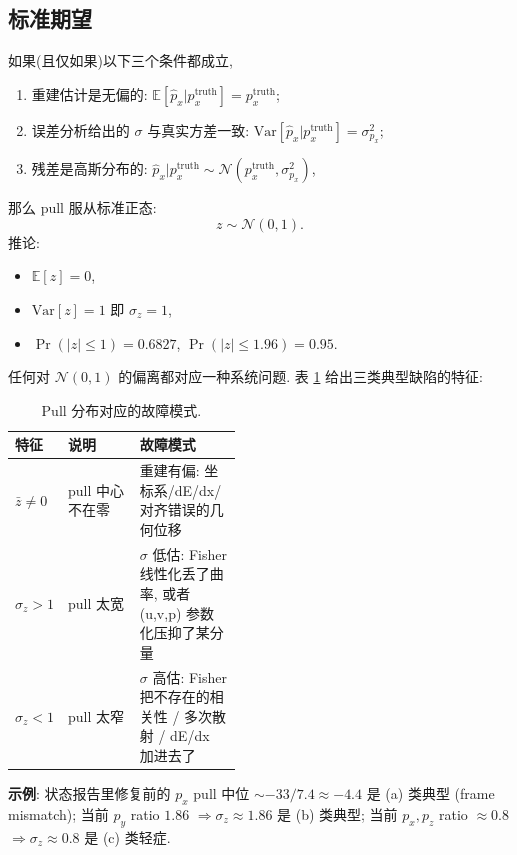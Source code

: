 \subsection{标准期望}
\label{sec:partIII:pulls:expected}

如果(且仅如果)以下三个条件都成立,
\begin{enumerate}[label=(\alph*), nosep]
  \item 重建估计是无偏的: $\mathbb{E}[\hat p_x | p_x^{\mathrm{truth}}] = p_x^{\mathrm{truth}}$;
  \item 误差分析给出的 $\sigma$ 与真实方差一致: $\mathrm{Var}[\hat p_x | p_x^{\mathrm{truth}}] = \sigma_{p_x}^2$;
  \item 残差是高斯分布的: $\hat p_x | p_x^{\mathrm{truth}} \sim \mathcal{N}(p_x^{\mathrm{truth}}, \sigma_{p_x}^2)$,
\end{enumerate}
那么 pull 服从标准正态:
\[
  z \sim \mathcal{N}(0, 1).
\]
推论:
\begin{itemize}[nosep]
  \item $\mathbb{E}[z] = 0$,
  \item $\mathrm{Var}[z] = 1$ 即 $\sigma_z = 1$,
  \item $\Pr(|z| \le 1) = 0.6827$, $\Pr(|z| \le 1.96) = 0.95$.
\end{itemize}
任何对 $\mathcal{N}(0,1)$ 的偏离都对应一种系统问题. 表 \ref{tab:partIII:pull_diagnostics_template} 给出三类典型缺陷的特征:

\begin{table}[H]
\centering\small
\caption{Pull 分布对应的故障模式.}
\label{tab:partIII:pull_diagnostics_template}
\begin{tabular}{llp{0.45\linewidth}}
\toprule
特征 & 说明 & 故障模式 \\
\midrule
$\bar z \ne 0$ & pull 中心不在零 & 重建有偏: 坐标系/dE/dx/对齐错误的几何位移 \\
$\sigma_z > 1$ & pull 太宽 & $\sigma$ 低估: Fisher 线性化丢了曲率, 或者 (u,v,p) 参数化压抑了某分量 \\
$\sigma_z < 1$ & pull 太窄 & $\sigma$ 高估: Fisher 把不存在的相关性 / 多次散射 / dE/dx 加进去了 \\
\bottomrule
\end{tabular}
\end{table}

\textbf{示例}: 状态报告里修复前的 $p_x$ pull 中位 $\sim -33 / 7.4 \approx -4.4$ 是 (a) 类典型 (frame mismatch); 当前 $p_y$ ratio $1.86$ $\Rightarrow \sigma_z \approx 1.86$ 是 (b) 类典型; 当前 $p_x, p_z$ ratio $\approx 0.8$ $\Rightarrow \sigma_z \approx 0.8$ 是 (c) 类轻症.

